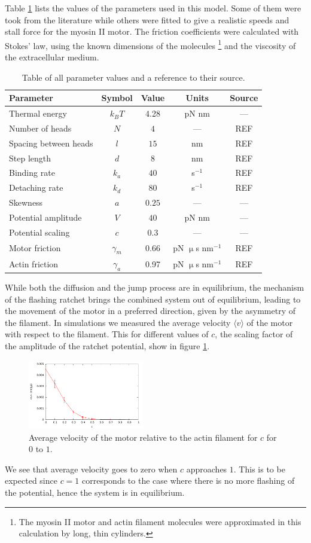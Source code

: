 \documentclass[aps,pre,twocolumn,showpacs,showkeys,a4paper]{revtex4}
\begin{document}
Table \ref{Tab: Parameters} lists the values of the parameters used in this model. 
Some of them were took from the literature while others were fitted to give a realistic speeds and stall force for the myosin II motor. 
The friction coefficients were calculated with Stokes' law, using the known dimensions of the molecules \footnote{The myosin II motor and actin filament molecules were approximated in this calculation by long, thin cylinders.} and the viscosity of the extracellular medium.
\begin{table}[t]
\centering
\begin{tabular}{lcccc}
Parameter & Symbol & Value & Units & Source\\
\hline\hline
Thermal energy & $k_B T$ & 4.28 & pN nm & --- \\
Number of heads & $N$ & $4$ & --- & REF\\
Spacing between heads & $l$ & $15$ & nm & REF\\
Step length & $d$ & $8$ & nm & REF\\
Binding rate & $k_{a}$ & $40$ & s$^{-1}$ & REF\\
Detaching rate & $k_{d}$ & $80$ & s$^{-1}$ & REF\\
Skewness & $a$ & $0.25$ & --- & ---\\
Potential amplitude & $V$ & $40$ & pN nm & ---\\
Potential scaling & $c$ & $0.3$ & --- & ---\\
Motor friction & $\gamma_{m}$ & 0.66 & pN $\upmu$s nm$^{-1}$ & REF\\
Actin friction & $\gamma_{a}$ & 0.97 & pN $\upmu$s nm$^{-1}$ & REF\\
\end{tabular}
\caption{Table of all parameter values and a reference to their source.}
\label{Tab: Parameters}
\end{table}

While both the diffusion and the jump process are in equilibrium, the mechanism of the flashing ratchet brings the combined system out of equilibrium, leading to the movement of the motor in a preferred direction, given by the asymmetry of the filament. 
In simulations we measured the average velocity $\langle v\rangle$ of the motor with respect to the filament. 
This for different values of $c$, the scaling factor of the amplitude of the ratchet potential, show in figure \ref{Fig: c_v}.
\begin{figure}[b]
\centering
\includegraphics[width=0.45\textwidth,height=!]{c_v_4heads}
\caption{Average velocity of the motor relative to the actin filament for $c$ for $0$ to $1$.} 
\label{Fig: c_v}
\end{figure}
We see that average velocity goes to zero when $c$ approaches $1$. 
This is to be expected since $c=1$ corresponds to the case where there is no more flashing of the potential, hence the system is in equilibrium.
\end{document}
